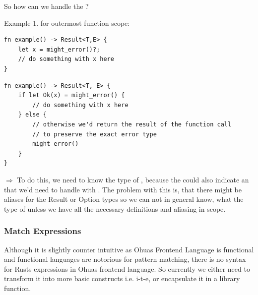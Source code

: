 So how can we handle the ?

Example 1. for outermost function scope:
\begin{verbatim}
fn example() -> Result<T,E> {
    let x = might_error()?;
    // do something with x here
}
\end{verbatim}

\begin{verbatim}
fn example() -> Result<T, E> {
    if let Ok(x) = might_error() {
        // do something with x here
    } else {
        // otherwise we'd return the result of the function call
        // to preserve the exact error type
        might_error() 
    }   
}
\end{verbatim}
$\Rightarrow$ To do this, we need to know the type of , because the  could also indicate an  that we'd need to handle with  . The problem with this is, that there might be aliases for the Result or Option types so we can not in general know, what the type of  unless we have all the necessary definitions and aliasing in scope.\\

\bigskip

\subsubsection{Match Expressions}
Although it is slightly counter intuitive as Ohuas Frontend Language is functional and functional languages are notorious for pattern matching, there is no syntax for Rusts  expressions in Ohuas frontend language. So currently we either need to transform it into more basic constructs i.e. i-t-e, or encapsulate it in a library function. \\

